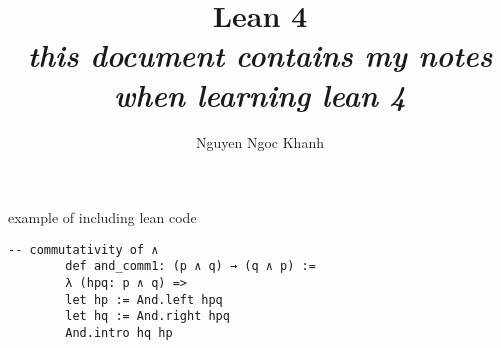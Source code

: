 \documentclass{report}
\title{
	Lean 4 \\
	\large \textit{
		this document contains my notes when learning lean 4
	}
}
\author{Nguyen Ngoc Khanh}
\begin{document}
	
	\maketitle
	
	\tableofcontents
	
	
	example of including lean code
	
	\begin{lstlisting}[language=lean]
		-- commutativity of ∧
		def and_comm1: (p ∧ q) → (q ∧ p) :=
		λ (hpq: p ∧ q) =>
		let hp := And.left hpq
		let hq := And.right hpq
		And.intro hq hp
	\end{lstlisting}
	
	
	
	
	
	
	
	
\end{document}
